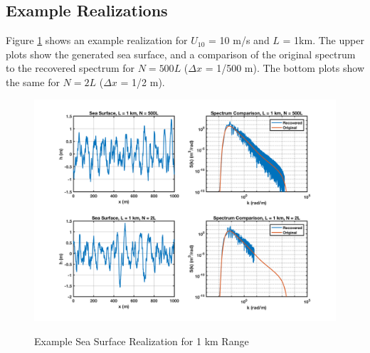 \subsection{Example Realizations}
Figure \ref{os_fig:7a} shows an example realization for $U_{10}$ = 10 m/s and $L$ = 1km. The upper plots show the generated sea surface, and a comparison of the original spectrum to the recovered spectrum for $N = 500L$ ($\Delta x$ = 1/500 m). The bottom plots show the same for $N=2L$ ($\Delta x$ = 1/2 m).
\begin{figure}[H]
  \begin{center}
\includegraphics[width=6in]{../media/Ocean_Surface/sea_surface_1000.png}
  \end{center}
  \renewcommand{\baselinestretch}{1} \small\normalsize
  \begin{quote}
    \caption[Example Sea Surface Realization for 1 km Range]{Example Sea Surface Realization for 1 km Range\label{os_fig:7a}}
  \end{quote}
\end{figure}
\renewcommand{\baselinestretch}{2} \small\normalsize


